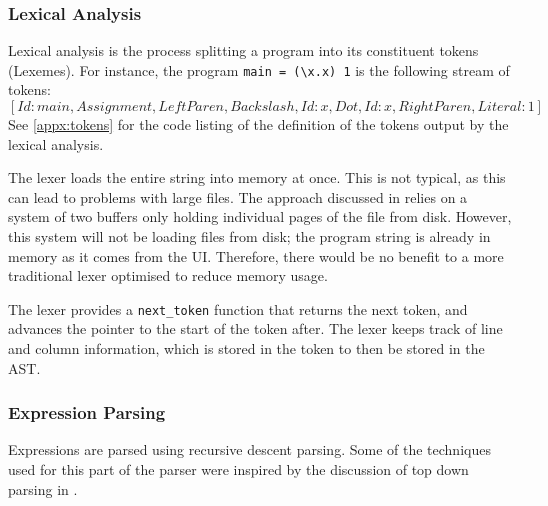 \subsubsection{Lexical Analysis}
Lexical analysis is the process splitting a program into its constituent tokens (Lexemes). For instance, the program \verb|main = (\x.x) 1| is the following stream of tokens: \[[Id: main, Assignment, LeftParen, Backslash, Id: x, Dot, Id: x, RightParen, Literal: 1]\]
See \ref{appx:tokens} for the code listing of the definition of the tokens output by the lexical analysis.

The lexer loads the entire string into memory at once. This is not typical, as this can lead to problems with large files. The approach discussed in \cite{dragon_book} relies on a system of two buffers only holding individual pages of the file from disk. However, this system will not be loading files from disk; the program string is already in memory as it comes from the UI. Therefore, there would be no benefit to a more traditional lexer optimised to reduce memory usage. 

The lexer provides a \verb|next_token| function that returns the next token, and advances the pointer to the start of the token after. The lexer keeps track of line and column information, which is stored in the token to then be stored in the AST. 

\subsubsection{Expression Parsing}
Expressions are parsed using recursive descent parsing. Some of the techniques used for this part of the parser were inspired by the discussion of top down parsing in \cite{dragon_book}. 

